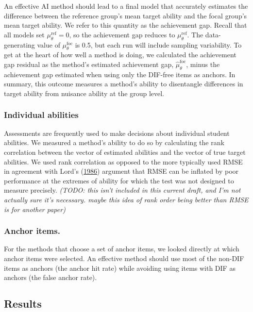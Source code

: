 \documentclass[
  11pt,
]{article}
\begin{document}
An effective AI method should lead to a final model that accurately estimates the difference between the reference group's mean target ability and the focal group's mean target ability. We refer to this quantity as the achievement gap. Recall that all models set \(\mu_\theta^\text{ref} = 0\), so the achievement gap reduces to \(\mu_\theta^\text{ref}\). The data-generating value of \(\mu_\theta^\text{foc}\) is 0.5, but each run will include sampling variability. To get at the heart of how well a method is doing, we calculated the achievement gap residual as the method's estimated achievement gap, \(\hat\mu_\theta^\text{foc}\), minus the achievement gap estimated when using only the DIF-free items as anchors. In summary, this outcome measures a method's ability to disentangle differences in target ability from nuisance ability at the group level.

\hypertarget{individual-abilities}{%
\subsubsection{Individual abilities}\label{individual-abilities}}

Assessments are frequently used to make decisions about individual student abilities. We measured a method's ability to do so by calculating the rank correlation between the vector of estimated abilities and the vector of true target abilities. We used rank correlation as opposed to the more typically used RMSE in agreement with Lord's (\protect\hyperlink{ref-lord1986maximum}{1986}) argument that RMSE can be inflated by poor performance at the extremes of ability for which the test was not designed to measure precisely. \emph{(TODO: this isn't included in this current draft, and I'm not actually sure it's necessary. maybe this idea of rank order being better than RMSE is for another paper)}

\hypertarget{anchor-items.}{%
\subsubsection{Anchor items.}\label{anchor-items.}}

For the methods that choose a set of anchor items, we looked directly at which anchor items were selected. An effective method should use most of the non-DIF items as anchors (the anchor hit rate) while avoiding using items with DIF as anchors (the false anchor rate).

\hypertarget{results}{%
\subsection{Results}\label{results}}
\end{document}
